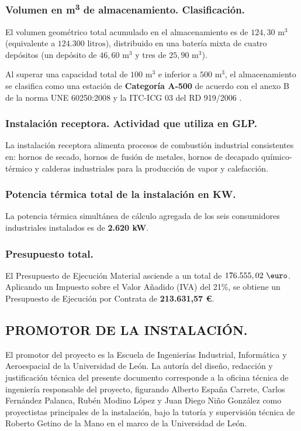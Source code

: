 \documentclass[12pt]{article}
\begin{document}
            \subsubsection{Volumen en \texorpdfstring{m\textsuperscript{3}}{m³} de almacenamiento. Clasificación.}
            El volumen geométrico total acumulado en el almacenamiento es de $124,30\text{ m}^3$ (equivalente a $124.300\text{ litros}$), distribuido en una batería mixta de cuatro depósitos (un depósito de $46,60\text{ m}^3$ y tres de $25,90\text{ m}^3$).
            
            Al superar una capacidad total de $100\text{ m}^3$ e inferior a $500\text{ m}^3$, el almacenamiento se clasifica como una estación de \textbf{Categoría A-500} de acuerdo con el anexo B de la norma UNE 60250:2008 \cite{une60250} y la ITC-ICG 03 del RD 919/2006 \cite{rd919}.
            
            \subsubsection{Instalación receptora. Actividad que utiliza en GLP.}
            La instalación receptora alimenta procesos de combustión industrial consistentes en: hornos de secado, hornos de fusión de metales, hornos de decapado químico-térmico y calderas industriales para la producción de vapor y calefacción.
            
            \subsubsection{Potencia térmica total de la instalación en KW.}
            La potencia térmica simultánea de cálculo agregada de los seis consumidores industriales instalados es de \textbf{2.620 kW}.
            
            \subsubsection{Presupuesto total.}
            El Presupuesto de Ejecución Material asciende a un total de $176.555,02\text{ \euro}$. Aplicando un Impuesto sobre el Valor Añadido (IVA) del 21\%, se obtiene un Presupuesto de Ejecución por Contrata de \textbf{213.631,57 \euro}.
        
        \subsection{PROMOTOR DE LA INSTALACIÓN.}
        El promotor del proyecto es la Escuela de Ingenierías Industrial, Informática y Aeroespacial de la Universidad de León. La autoría del diseño, redacción y justificación técnica del presente documento corresponde a la oficina técnica de ingeniería responsable del proyecto, figurando Alberto España Carrete, Carlos Fernández Palanca, Rubén Modino López y Juan Diego Niño González como proyectistas principales de la instalación, bajo la tutoría y supervisión técnica de Roberto Getino de la Mano en el marco de la Universidad de León.
        
\end{document}
